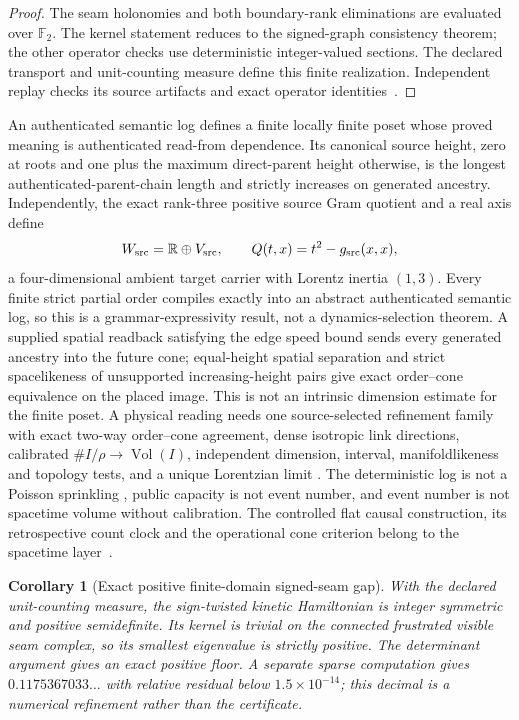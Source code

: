 \documentclass[11pt]{article}
\newtheorem{corollary}[theorem]{Corollary}
\theoremstyle{remark}
\theoremstyle{plain}
\begin{document}
\begin{proof}
The seam holonomies and both boundary-rank eliminations are evaluated over
\(\mathbb F_2\). The kernel statement reduces to the signed-graph consistency
theorem; the other operator checks use deterministic integer-valued sections.
The declared transport and unit-counting measure define this finite
realization. Independent replay checks its source artifacts and exact
operator identities~\cite{ophfpe}.
\end{proof}

An authenticated semantic log defines a finite locally finite poset
\cite{bombelli1987,surya2019} whose proved meaning is authenticated read-from
dependence. Its canonical source height, zero at roots and one plus the
maximum direct-parent height otherwise, is the longest
authenticated-parent-chain length and strictly increases on generated
ancestry. Independently, the exact rank-three positive source Gram quotient
and a real axis define
\[
 W_{\rm src}=\mathbb R\oplus V_{\rm src},\qquad
 Q(t,x)=t^2-g_{\rm src}(x,x),
\]
a four-dimensional ambient target carrier with Lorentz inertia \((1,3)\).
Every finite strict partial order compiles exactly into an abstract
authenticated semantic log, so this is a grammar-expressivity result, not a
dynamics-selection theorem. A supplied spatial readback satisfying the edge
speed bound sends every generated ancestry into the future cone; equal-height
spatial separation and strict spacelikeness of unsupported increasing-height
pairs give exact order--cone equivalence on the placed image. This is not an
intrinsic dimension estimate for the finite poset. A physical reading needs
one source-selected refinement family with exact two-way order--cone
agreement, dense isotropic link directions, calibrated
\(\#I/\rho\to\operatorname{Vol}(I)\), independent dimension, interval,
manifoldlikeness and topology tests, and a unique Lorentzian limit
\cite{bombellimeyer1989,brightwellgregory1991,majorrideoutsurya2007,majorrideoutsurya2009,hawkingkingmccarthy1976,malament1977}.
The deterministic log is not a Poisson sprinkling
\cite{bombellihensonsorkin2009}, public capacity is not event number, and
event number is not spacetime volume without calibration. The controlled
flat causal construction, its retrospective count clock and the operational
cone criterion belong to the spacetime layer~\cite{ophEinstein}.

\begin{corollary}[Exact positive finite-domain signed-seam gap]
\label{cor:finite-source-positive-gap}
With the declared unit-counting measure, the sign-twisted kinetic Hamiltonian
is integer symmetric and positive semidefinite. Its kernel is trivial on the
connected frustrated visible seam complex, so its smallest eigenvalue is
strictly positive. The determinant argument gives an exact positive floor. A
separate sparse computation gives
\(0.1175367033\ldots\) with relative residual below
\(1.5\times10^{-14}\); this decimal is a numerical refinement rather than the
certificate.
\end{corollary}
\end{document}
